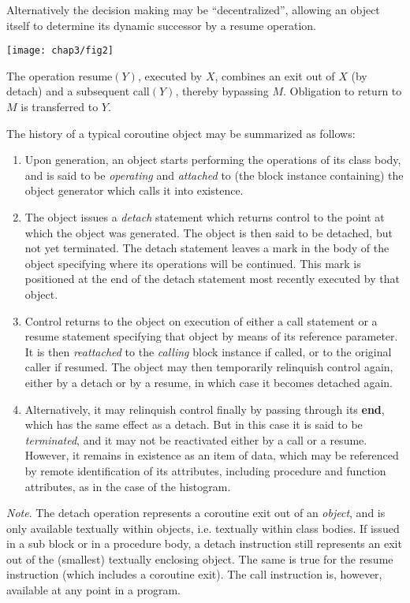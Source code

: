 \noindent
Alternatively the decision making may be ``decentralized'', allowing an object itself to determine its dynamic successor by a resume operation.

\begin{center}
	\texttt{[image: chap3/fig2]}
\end{center}

\noindent
The operation resume$(Y)$, executed by $X$, combines an exit out of $X$ (by detach) and a subsequent call$(Y)$, thereby bypassing $M$. Obligation to return to $M$ is transferred to $Y$.

The history of a typical coroutine object may be summarized as follows:

\begin{enumerate}[wide, nosep, label=(\arabic*)]
	\item Upon generation, an object starts performing the operations of its class body, and is said to be \textit{operating} and \textit{attached} to (the block instance containing) the object generator which calls it into existence.
	\item The object issues a \textit{detach} statement which returns control to the point at which the object was generated. The object is then said to be detached, but not yet terminated. The detach statement leaves a mark in the body of the object specifying where its operations will be continued. This mark is positioned at the end of the detach statement most recently executed by that object.
	\item Control returns to the object on execution of either a call statement or a resume statement specifying that object by means of its reference parameter. It is then \textit{reattached} to the \textit{calling} block instance if called, or to the original caller if resumed. The object may then temporarily relinquish control again, either by a detach or by a resume, in which case it becomes detached again. 
	\item Alternatively, it may relinquish control finally by passing through its \textbf{end}, which has the same effect as a detach. But in this case it is said to be \textit{terminated}, and it may not be reactivated either by a call or a resume. However, it remains in existence as an item of data, which may be referenced by remote identification of its attributes, including procedure and function attributes, as in the case of the histogram.
\end{enumerate}

\textit{Note}. The detach operation represents a coroutine exit out of an \textit{object}, and is only available textually within objects, i.e. textually within class bodies. If issued in a sub block or in a procedure body, a detach instruction still represents an exit out of the (smallest) textually enclosing object. The same
is true for the resume instruction (which includes a coroutine exit). The call instruction is, however, available at any point in a program.

